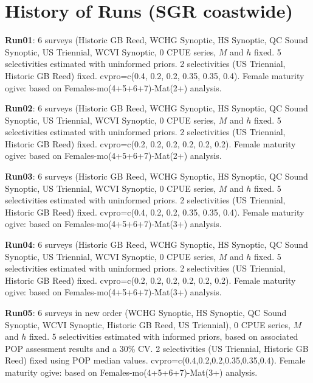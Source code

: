 
\section*{History of Runs (SGR coastwide)}

{\bf Run01}: 6 surveys (Historic GB Reed, WCHG Synoptic, HS Synoptic, QC Sound Synoptic, US Triennial, WCVI Synoptic, 0 CPUE series, $M$ and $h$ fixed. 5 selectivities estimated with uninformed priors. 2 selectivities (US Triennial,  Historic GB Reed) fixed. cvpro=c(0.4, 0.2, 0.2, 0.35, 0.35, 0.4).  Female maturity ogive: based on Females-mo(4+5+6+7)-Mat(2+) analysis. \newline  

{\bf Run02}: 6 surveys (Historic GB Reed, WCHG Synoptic, HS Synoptic, QC Sound Synoptic, US Triennial, WCVI Synoptic, 0 CPUE series, $M$ and $h$ fixed. 5 selectivities estimated with uninformed priors. 2 selectivities (US Triennial,  Historic GB Reed) fixed. cvpro=c(0.2, 0.2, 0.2, 0.2, 0.2, 0.2).  Female maturity ogive: based on Females-mo(4+5+6+7)-Mat(2+) analysis. \newline  

{\bf Run03}: 6 surveys (Historic GB Reed, WCHG Synoptic, HS Synoptic, QC Sound Synoptic, US Triennial, WCVI Synoptic, 0 CPUE series, $M$ and $h$ fixed. 5 selectivities estimated with uninformed priors. 2 selectivities (US Triennial,  Historic GB Reed) fixed. cvpro=c(0.4, 0.2, 0.2, 0.35, 0.35, 0.4).  Female maturity ogive: based on Females-mo(4+5+6+7)-Mat(3+) analysis. \newline  

{\bf Run04}: 6 surveys (Historic GB Reed, WCHG Synoptic, HS Synoptic, QC Sound Synoptic, US Triennial, WCVI Synoptic, 0 CPUE series, $M$ and $h$ fixed. 5 selectivities estimated with uninformed priors. 2 selectivities (US Triennial,  Historic GB Reed) fixed. cvpro=c(0.2, 0.2, 0.2, 0.2, 0.2, 0.2).  Female maturity ogive: based on Females-mo(4+5+6+7)-Mat(3+) analysis. \newline  

{\bf Run05}: 6 surveys in new order (WCHG Synoptic, HS Synoptic, QC Sound Synoptic, WCVI Synoptic, Historic GB Reed, US Triennial), 0 CPUE series, $M$ and $h$ fixed. 5 selectivities estimated with informed priors, based on associated POP assessment results and a 30\% CV. 2 selectivities (US Triennial,  Historic GB Reed) fixed using POP median values. cvpro=c(0.4,0.2,0.2,0.35,0.35,0.4).  Female maturity ogive: based on Females-mo(4+5+6+7)-Mat(3+) analysis. \newline  

